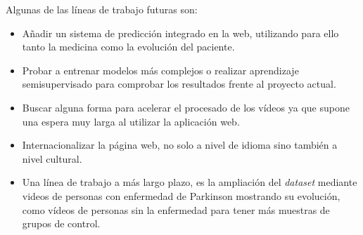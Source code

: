 Algunas de las líneas de trabajo futuras son:

\begin{itemize}
\item Añadir un sistema de predicción integrado en la web, utilizando para ello tanto la medicina como la evolución del paciente.

\item Probar a entrenar modelos más complejos o realizar aprendizaje semisupervisado para comprobar los resultados frente al proyecto actual.
\item Buscar alguna forma para acelerar el procesado de los vídeos ya que supone una espera muy larga al utilizar la aplicación web. 

\item Internacionalizar la página web, no solo a nivel de idioma sino también a nivel cultural.

\item Una línea de trabajo a más largo plazo, es la ampliación del \textit{dataset} mediante videos de personas con enfermedad de Parkinson mostrando su evolución, como vídeos de personas sin la enfermedad para tener más muestras de grupos de control.

\end{itemize}
